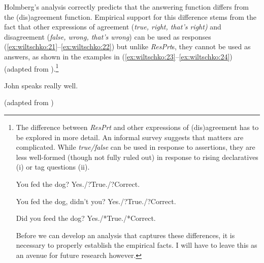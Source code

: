 \documentclass[output=paper]{LSP/langsci}
\begin{document}
Holmberg’s analysis correctly predicts that the answering function differs from the (dis)agreement function. Empirical support for this difference stems from the fact that other expressions of agreement (\textit{true, right, that’s right)} and disagreement (\textit{false, wrong, that’s wrong}) can be used as responses (\ref{ex:wiltschko:21}--\ref{ex:wiltschko:22}) but unlike \textit{ResPrt}s, they cannot be used as answers, as shown in the examples in (\ref{ex:wiltschko:23}--\ref{ex:wiltschko:24}) (adapted from \citealt[211 (5)]{holmberg:15}).\footnote{The difference between \textit{ResPrt} and other expressions of (dis)agreement has to be explored in more detail. An informal survey suggests that matters are complicated.
While \textit{true/false} can be used in response to assertions, they are less well-formed (though not fully ruled out) in response to rising declaratives (i) or tag questions (ii). 

\begin{exe}
 \ex 
 \begin{xlist}
  You fed the dog?
  Yes./?True./?Correct.
 \end{xlist}
 \ex 
 \begin{xlist}
  You fed the dog, didn’t you?
  Yes./?True./?Correct.
 \end{xlist}
 \ex 
 \begin{xlist}
  Did you feed the dog?
  Yes./*True./*Correct.
 \end{xlist}
\end{exe}

\noindent Before we can develop an analysis that captures these differences, it is necessary to properly establish the empirical facts. I will have to leave this as an avenue for future research however.}\largerpage[2]



\ea\label{ex:wiltschko:21}
\settowidth{}
\begin{xlist}
  {John speaks  really well.}   
\begin{xlisti}
\ex{}            
\ex{}          
\ex{}        
\ex{}  
\end{xlisti}
\end{xlist}
(adapted from \citealt[211 (4)]{holmberg:15})
\z
\end{document}
